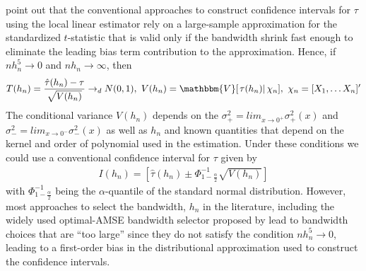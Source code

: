\documentclass[12pt,fleqn]{article}
\begin{document}
\cite{calonico2014} point out that the conventional approaches to construct confidence intervals for $\tau$ using the local linear estimator rely on a large-sample approximation for the standardized $t$-statistic that is valid only if the bandwidth shrink fast enough to eliminate the leading bias term contribution to the approximation. Hence, if $nh_{n}^{5}\rightarrow0$ and $nh_{n}\rightarrow \infty$, then
 \begin{align}
  T(h_{n})=\frac{\hat{\tau}(h_{n})-\tau}{\sqrt{V(h_{n})}}\rightarrow_{d}N(0,1), \text{        }V(h_{n})=\mathbbm{V}[\left.\tau(h_{n})\right|\chi_{n}], \text{        }\chi_{n}=[X_{1}, \dots X_{n}]^{\prime}
 \end{align}
 The conditional variance $V(h_{n})$ depends on the $\sigma^{2}_{+}=lim_{x \rightarrow 0^{+}}\sigma^{2}_{+}(x)$ and $\sigma^{2}_{-}=lim_{x \rightarrow 0^{-}}\sigma^{2}_{-}(x)$ as well as $h_{n}$ and known quantities that depend on the kernel and order of polynomial used in the estimation. Under these conditions we could use a conventional confidence interval for $\tau$ given by
 \begin{align}
  I(h_{n})=\left[\hat{\tau}(h_{n})\pm \Phi^{-1}_{1-\frac{\alpha}{2}}\sqrt{V(h_{n})} \right]
 \end{align}
with $\Phi^{-1}_{1-\frac{\alpha}{2}}$ being the $\alpha$-quantile of the standard normal distribution. However, most approaches to select the bandwidth, $h_{n}$ in the literature, including the widely used optimal-AMSE bandwidth selector proposed by \cite{IK} lead to bandwidth choices that are ``too large'' since they do not satisfy the condition $nh_{n}^{5}\rightarrow0$, leading to a first-order bias in the distributional approximation used to construct the confidence intervals.
\end{document}
